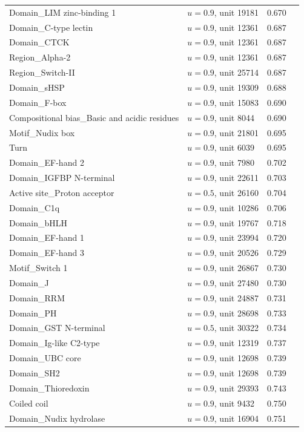 \documentclass{article}
\begin{document}
\begin{longtable}{p{6.2cm}p{1.6cm}rr}
Domain\_LIM zinc-binding 1 & $u{=}0.9$, unit 19181 & 0.670 \\
Domain\_C-type lectin & $u{=}0.9$, unit 12361 & 0.687 \\
Domain\_CTCK & $u{=}0.9$, unit 12361 & 0.687 \\
Region\_Alpha-2 & $u{=}0.9$, unit 12361 & 0.687 \\
Region\_Switch-II & $u{=}0.9$, unit 25714 & 0.687 \\
Domain\_sHSP & $u{=}0.9$, unit 19309 & 0.688 \\
Domain\_F-box & $u{=}0.9$, unit 15083 & 0.690 \\
Compositional bias\_Basic and acidic residues & $u{=}0.9$, unit 8044 & 0.690 \\
Motif\_Nudix box & $u{=}0.9$, unit 21801 & 0.695 \\
Turn & $u{=}0.9$, unit 6039 & 0.695 \\
Domain\_EF-hand 2 & $u{=}0.9$, unit 7980 & 0.702 \\
Domain\_IGFBP N-terminal & $u{=}0.9$, unit 22611 & 0.703 \\
Active site\_Proton acceptor & $u{=}0.5$, unit 26160 & 0.704 \\
Domain\_C1q & $u{=}0.9$, unit 10286 & 0.706 \\
Domain\_bHLH & $u{=}0.9$, unit 19767 & 0.718 \\
Domain\_EF-hand 1 & $u{=}0.9$, unit 23994 & 0.720 \\
Domain\_EF-hand 3 & $u{=}0.9$, unit 20526 & 0.729 \\
Motif\_Switch 1 & $u{=}0.9$, unit 26867 & 0.730 \\
Domain\_J & $u{=}0.9$, unit 27480 & 0.730 \\
Domain\_RRM & $u{=}0.9$, unit 24887 & 0.731 \\
Domain\_PH & $u{=}0.9$, unit 28698 & 0.733 \\
Domain\_GST N-terminal & $u{=}0.5$, unit 30322 & 0.734 \\
Domain\_Ig-like C2-type & $u{=}0.9$, unit 12319 & 0.737 \\
Domain\_UBC core & $u{=}0.9$, unit 12698 & 0.739 \\
Domain\_SH2 & $u{=}0.9$, unit 12698 & 0.739 \\
Domain\_Thioredoxin & $u{=}0.9$, unit 29393 & 0.743 \\
Coiled coil & $u{=}0.9$, unit 9432 & 0.750 \\
Domain\_Nudix hydrolase & $u{=}0.9$, unit 16904 & 0.751 \\

\end{longtable}
\end{document}
